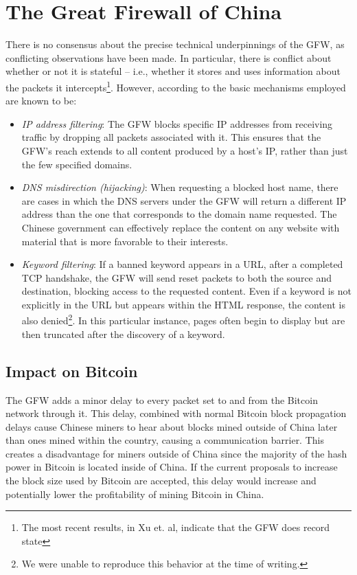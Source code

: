 \section{The Great Firewall of China}
There is no consensus about the precise technical underpinnings of the GFW, as conflicting observations have been made. In particular, there is conflict about whether or not it is stateful -- i.e., whether it stores and uses information about the packets it intercepts\footnote{The most recent results, in Xu et. al\cite{Xu2011}, indicate that the GFW does record state}. However, according to \cite{GFWStanord} the basic mechanisms employed are known to be:

\begin{itemize}
\item \textit{IP address filtering}:
The GFW blocks specific IP addresses from receiving traffic by dropping all packets associated with it. This ensures that the GFW's reach extends to all content produced by a host's IP, rather than just the few specified domains.

\item \textit{DNS misdirection (hijacking)}:
When requesting a blocked host name, there are cases in which the DNS servers under the GFW will return a different IP address than the one that corresponds to the domain name requested. The Chinese government can effectively replace the content on any website with material that is more favorable to their interests.

\item \textit{Keyword filtering}:
If a banned keyword appears in a URL, after a completed TCP handshake, the GFW will send reset packets to both the source and destination, blocking access to the requested content. Even if a keyword is not explicitly in the URL but appears within the HTML response, the content is also denied\footnote{We were unable to reproduce this behavior at the time of writing.}. In this particular instance, pages often begin to display but are then truncated after the discovery of a keyword.
\end{itemize}

\subsection{Impact on Bitcoin}
The GFW adds a minor delay to every packet set to and from the Bitcoin network through it. This delay, combined with normal Bitcoin block propagation delays cause Chinese miners to hear about blocks mined outside of China later than ones mined within the country, causing a communication barrier. This creates a disadvantage for miners outside of China since the majority of the hash power in Bitcoin is located inside of China. If the current proposals to increase the block size used by Bitcoin are accepted, this delay would increase and potentially lower the profitability of mining Bitcoin in China.  \cite{nasdaq}

